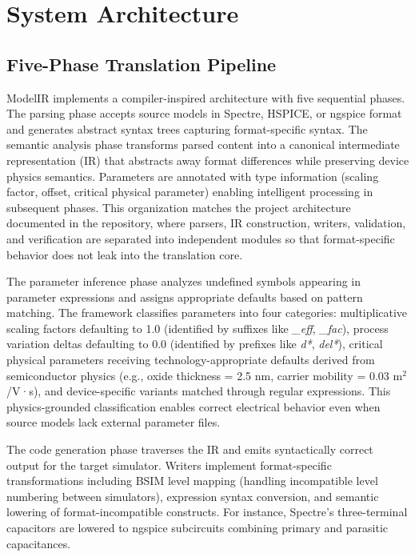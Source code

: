 \documentclass[10pt,twocolumn]{article}
\begin{document}
\section{System Architecture}

\subsection{Five-Phase Translation Pipeline}

ModelIR implements a compiler-inspired architecture with five sequential phases. The parsing phase accepts source models in Spectre, HSPICE, or ngspice format and generates abstract syntax trees capturing format-specific syntax. The semantic analysis phase transforms parsed content into a canonical intermediate representation (IR) that abstracts away format differences while preserving device physics semantics. Parameters are annotated with type information (scaling factor, offset, critical physical parameter) enabling intelligent processing in subsequent phases. This organization matches the project architecture documented in the repository, where parsers, IR construction, writers, validation, and verification are separated into independent modules so that format-specific behavior does not leak into the translation core.

The parameter inference phase analyzes undefined symbols appearing in parameter expressions and assigns appropriate defaults based on pattern matching. The framework classifies parameters into four categories: multiplicative scaling factors defaulting to 1.0 (identified by suffixes like \textit{\_eff}, \textit{\_fac}), process variation deltas defaulting to 0.0 (identified by prefixes like \textit{d*}, \textit{del*}), critical physical parameters receiving technology-appropriate defaults derived from semiconductor physics (e.g., oxide thickness = 2.5 nm, carrier mobility = 0.03 m$^2$/V·s), and device-specific variants matched through regular expressions. This physics-grounded classification enables correct electrical behavior even when source models lack external parameter files.

The code generation phase traverses the IR and emits syntactically correct output for the target simulator. Writers implement format-specific transformations including BSIM level mapping (handling incompatible level numbering between simulators), expression syntax conversion, and semantic lowering of format-incompatible constructs. For instance, Spectre's three-terminal capacitors are lowered to ngspice subcircuits combining primary and parasitic capacitances.
\end{document}
